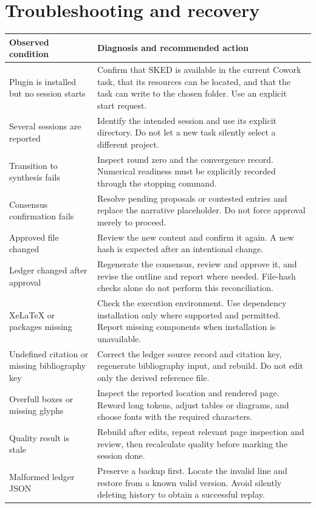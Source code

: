 \documentclass[12pt,a4paper]{article}
\begin{document}
\section{Troubleshooting and recovery}
\begin{longtable}{@{}P{43mm}P{116mm}@{}}
\toprule
Observed condition & Diagnosis and recommended action\\
\midrule\endhead
Plugin is installed but no session starts & Confirm that SKED is available in the current Cowork task, that its resources can be located, and that the task can write to the chosen folder. Use an explicit start request.\\
Several sessions are reported & Identify the intended session and use its explicit directory. Do not let a new task silently select a different project.\\
Transition to synthesis fails & Inspect round zero and the convergence record. Numerical readiness must be explicitly recorded through the stopping command.\\
Consensus confirmation fails & Resolve pending proposals or contested entries and replace the narrative placeholder. Do not force approval merely to proceed.\\
Approved file changed & Review the new content and confirm it again. A new hash is expected after an intentional change.\\
Ledger changed after approval & Regenerate the consensus, review and approve it, and revise the outline and report where needed. File-hash checks alone do not perform this reconciliation.\\
XeLaTeX or packages missing & Check the execution environment. Use dependency installation only where supported and permitted. Report missing components when installation is unavailable.\\
Undefined citation or missing bibliography key & Correct the ledger source record and citation key, regenerate bibliography input, and rebuild. Do not edit only the derived reference file.\\
Overfull boxes or missing glyphs & Inspect the reported location and rendered page. Reword long tokens, adjust tables or diagrams, and choose fonts with the required characters.\\
Quality result is stale & Rebuild after edits, repeat relevant page inspection and review, then recalculate quality before marking the session done.\\
Malformed ledger JSON & Preserve a backup first. Locate the invalid line and restore from a known valid version. Avoid silently deleting history to obtain a successful replay.\\
\bottomrule
\end{longtable}
\end{document}
